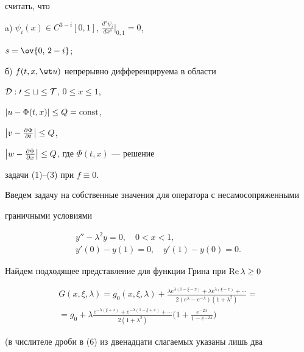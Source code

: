 считать, что 


 


a) $\psi_i(x)\in C^{3-i}[0,1]$, $\frac{d^s\psi_i}{dx^s}\Big|_{0,1}=0$, 


$s=\ov{0,\,2-i}$; 


 


б) $f(t,x,\wt u)$ непрерывно дифференцируема в области 


$\cal D:0\le t\le T$, $0\le x\le 1$, 


$|u-\Phi(t,x)|\le Q=\operatorname{const}$, 


$\left|v-\frac{\partial \Phi}{\partial t}\right|\le Q$, 


$\left|w-\frac{\partial \Phi}{\partial x}\right|\le Q$, где $\Phi(t,x)$ --- решение 


задачи (1)--(3) при $f\equiv 0$. 


 


Введем задачу на собственные значения для оператора с несамосопряженными 


граничными условиями 


\begin{gather} 


y''-\lambda^2y=0,\quad 0<x<1,\\ 


y'(0)-y(1)=0,\quad y'(1)-y(0)=0. 


\end{gather} 


Найдем подходящее представление для функции Грина при $\operatorname{Re}\lambda\ge 0$ 


\begin{multline} 


G(x,\xi,\lambda)=g_0(x,\xi,\lambda)+ 


\frac{\lambda e^{\lambda(1-\xi-x)}+\lambda e^{\lambda(\xi-x)}+\dotsb} 


{2(e^\lambda-e^{-\lambda})(1+\lambda^2)}=\\


=g_0+\lambda 


\frac{e^{-\lambda(\xi+x)}+e^{-\lambda(1-\xi+x)}+\dotsb} 


{2(1+\lambda^2)}\biggl(1+\frac{e^{-2\lambda}}{1-e^{-2\lambda}} 


\biggr) 


\end{multline} 


(в числителе дроби в (6) из двенадцати слагаемых указаны лишь два 


